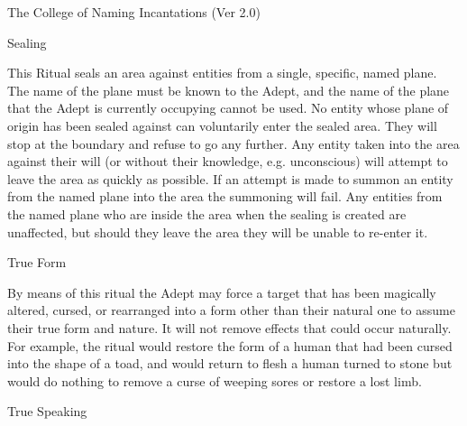 \begin{Chapter}{The College of Naming Incantations (Ver 2.0)}
\begin{ritual}[R-5]{Sealing}

\begin{effects}
This Ritual seals an area against entities from a single, specific,
named plane. The name of the plane must be known to the Adept, and the
name of the plane that the Adept is currently occupying cannot be
used.  No entity whose plane of origin has been sealed against can
voluntarily enter the sealed area. They will stop at the boundary and
refuse to go any further.  Any entity taken into the area against
their will (or without their knowledge, e.g.  unconscious) will
attempt to leave the area as quickly as possible.  If an attempt is
made to summon an entity from the named plane into the area the
summoning will fail.  Any entities from the named plane who are inside
the area when the sealing is created are unaffected, but should they
leave the area they will be unable to re-enter it.
\end{effects}
\end{ritual}

\begin{ritual}[R-6]{True Form}
\begin{effects}
By means of this ritual the Adept may force a target that has been
magically altered, cursed, or rearranged into a form other than their
natural one to assume their true form and nature. It will not remove
effects that could occur naturally.  For example, the ritual would
restore the form of a human that had been cursed into the shape of a
toad, and would return to flesh a human turned to stone but would do
nothing to remove a curse of weeping sores or restore a lost limb.
\end{effects}
\end{ritual}

\begin{ritual}[R-7]{True Speaking}


\end{ritual}
\end{Chapter}

